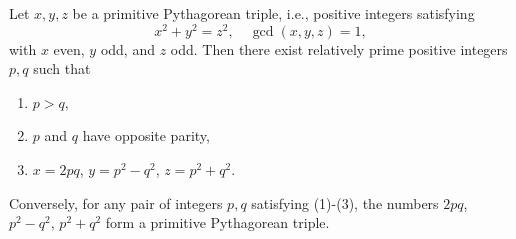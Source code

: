 Let $x, y, z$ be a primitive Pythagorean triple, i.e., positive integers satisfying
$$x^2 + y^2 = z^2, \quad \gcd(x,y,z) = 1,$$
with $x$ even, $y$ odd, and $z$ odd. Then there exist relatively prime positive integers $p, q$ such that
\begin{enumerate}
\item $p > q$,
\item $p$ and $q$ have opposite parity,
\item $x = 2pq$, $y = p^2 - q^2$, $z = p^2 + q^2$.
\end{enumerate}
Conversely, for any pair of integers $p, q$ satisfying (1)-(3), the numbers $2pq$, $p^2 - q^2$, $p^2 + q^2$ form a primitive Pythagorean triple.
